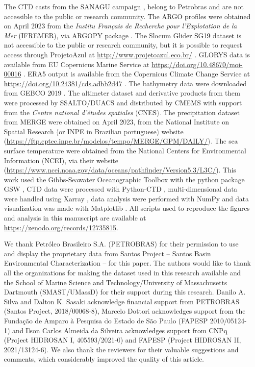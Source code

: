 \documentclass[draft]{agujournal2019}
\begin{document}
The CTD casts from the SANAGU campaign \cite{moreira2023multidisciplinary}, belong to Petrobras and are not accessible to the public or research community. The ARGO profiles were obtained on April 2023 from the \textit{Institu Français de Recherche pour l'Explotation de la Mer} (IFREMER), via ARGOPY package \cite{Maze2020}. The Slocum Glider SG19 dataset is not accessible to the public or research community, but it is possible to request access through ProjetoAzul at \url{http://www.projetoazul.eco.br/} \cite{projetoazul2015}. GLORYS data is available from EU Copernicus Marine Service at \url{https://doi.org/10.48670/moi-00016} \cite{jean2021glorys}. ERA5 output is available from the Copernicus Climate Change Service at \url{https://doi.org/10.24381/cds.adbb2d47} \cite{hersbach2018era5}. The bathymetry data were downloaded from GEBCO 2019 \cite{weatherall2015new}. The altimeter dataset and derivative products from them were processed by SSALTO/DUACS and distributed by CMEMS \cite{aviso_cmems,aviso_cmems_ssh_at} with support from the \textit{Centre national d'études spatiales} (CNES).  The precipitation dataset from MERGE were obtained on April 2023, from the National Institute on Spatial Research (or INPE in Brazilian portuguese) website (\url{https://ftp.cptec.inpe.br/modelos/tempo/MERGE/GPM/DAILY/}). The sea surface temperature were obtained from the National Centers for Environmental Information (NCEI), via their website (\url{https://www.ncei.noaa.gov/data/oceans/pathfinder/Version5.3/L3C/}). This work used the Gibbs-Seawater Oceanographic Toolbox with the python package GSW \cite{mcdougall2011gsw}, CTD data were processed with Python-CTD \cite{Fernandes2014}, multi-dimensional data were handled using Xarray \cite{xarray2017}, data analysis were performed with NumPy \cite{numpy2020} and data visualization was made with Matplotlib \cite{Hunter2007Matplotlib}. All scripts used to reproduce the figures and analysis in this manuscript are available at \url{https://zenodo.org/records/12735815}.

\acknowledgments
We thank Petróleo Brasileiro S.A. (PETROBRAS) for their permission to use and display the proprietary data from Santos Project – Santos Basin Environmental Characterization – for this paper. The authors would like to thank all the organizations for making the dataset used in this research available and the School of Marine Science and Technology/University of Massachusetts Dartmouth (SMAST/UMassD) for their support during this research. Danilo A. Silva and Dalton K. Sasaki acknowledge financial support from PETROBRAS (Santos Project, 2018/00068-8), Marcelo Dottori acknowledges support from the Fundação de Amparo à Pesquisa do Estado de São Paulo (FAPESP 2010/05124-1) and Ilson Carlos Almeida da Silveira acknowledges support from CNPq (Project HIDROSAN I, 405593/2021-0) and FAPESP (Project HIDROSAN II, 2021/13124-6). We also thank the reviewers for their valuable suggestions and comments, which considerably improved the quality of this article.


%
\end{document}
